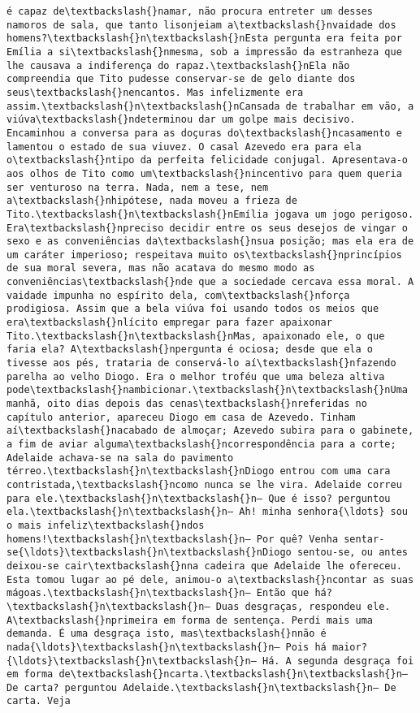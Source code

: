 \documentclass[11pt]{article}
\begin{document}
\begin{Verbatim}[commandchars=\\\{\}]
é capaz de\textbackslash{}namar, não procura entreter um desses namoros de sala, que tanto lisonjeiam a\textbackslash{}nvaidade dos homens?\textbackslash{}n\textbackslash{}nEsta pergunta era feita por Emília a si\textbackslash{}nmesma, sob a impressão da estranheza que lhe causava a indiferença do rapaz.\textbackslash{}nEla não compreendia que Tito pudesse conservar-se de gelo diante dos seus\textbackslash{}nencantos. Mas infelizmente era assim.\textbackslash{}n\textbackslash{}nCansada de trabalhar em vão, a viúva\textbackslash{}ndeterminou dar um golpe mais decisivo. Encaminhou a conversa para as doçuras do\textbackslash{}ncasamento e lamentou o estado de sua viuvez. O casal Azevedo era para ela o\textbackslash{}ntipo da perfeita felicidade conjugal. Apresentava-o aos olhos de Tito como um\textbackslash{}nincentivo para quem queria ser venturoso na terra. Nada, nem a tese, nem a\textbackslash{}nhipótese, nada moveu a frieza de Tito.\textbackslash{}n\textbackslash{}nEmília jogava um jogo perigoso. Era\textbackslash{}npreciso decidir entre os seus desejos de vingar o sexo e as conveniências da\textbackslash{}nsua posição; mas ela era de um caráter imperioso; respeitava muito os\textbackslash{}nprincípios de sua moral severa, mas não acatava do mesmo modo as conveniências\textbackslash{}nde que a sociedade cercava essa moral. A vaidade impunha no espírito dela, com\textbackslash{}nforça prodigiosa. Assim que a bela viúva foi usando todos os meios que era\textbackslash{}nlícito empregar para fazer apaixonar Tito.\textbackslash{}n\textbackslash{}nMas, apaixonado ele, o que faria ela? A\textbackslash{}npergunta é ociosa; desde que ela o tivesse aos pés, trataria de conservá-lo aí\textbackslash{}nfazendo parelha ao velho Diogo. Era o melhor troféu que uma beleza altiva pode\textbackslash{}nambicionar.\textbackslash{}n\textbackslash{}nUma manhã, oito dias depois das cenas\textbackslash{}nreferidas no capítulo anterior, apareceu Diogo em casa de Azevedo. Tinham aí\textbackslash{}nacabado de almoçar; Azevedo subira para o gabinete, a fim de aviar alguma\textbackslash{}ncorrespondência para a corte; Adelaide achava-se na sala do pavimento térreo.\textbackslash{}n\textbackslash{}nDiogo entrou com uma cara contristada,\textbackslash{}ncomo nunca se lhe vira. Adelaide correu para ele.\textbackslash{}n\textbackslash{}n— Que é isso? perguntou ela.\textbackslash{}n\textbackslash{}n— Ah! minha senhora{\ldots} sou o mais infeliz\textbackslash{}ndos homens!\textbackslash{}n\textbackslash{}n— Por quê? Venha sentar-se{\ldots}\textbackslash{}n\textbackslash{}nDiogo sentou-se, ou antes deixou-se cair\textbackslash{}nna cadeira que Adelaide lhe ofereceu. Esta tomou lugar ao pé dele, animou-o a\textbackslash{}ncontar as suas mágoas.\textbackslash{}n\textbackslash{}n— Então que há?\textbackslash{}n\textbackslash{}n— Duas desgraças, respondeu ele. A\textbackslash{}nprimeira em forma de sentença. Perdi mais uma demanda. É uma desgraça isto, mas\textbackslash{}nnão é nada{\ldots}\textbackslash{}n\textbackslash{}n— Pois há maior?{\ldots}\textbackslash{}n\textbackslash{}n— Há. A segunda desgraça foi em forma de\textbackslash{}ncarta.\textbackslash{}n\textbackslash{}n— De carta? perguntou Adelaide.\textbackslash{}n\textbackslash{}n— De carta. Veja 
\end{Verbatim}
\end{document}
